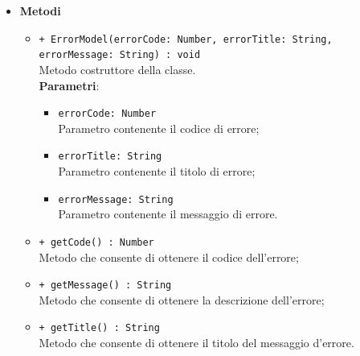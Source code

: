 \begin{itemize}
			\item \textbf{Metodi}
			\begin{itemize}
				\item \texttt{+ ErrorModel(errorCode: Number, errorTitle: String, errorMessage: String) : void} \\
				Metodo costruttore della classe.\\
				\textbf{Parametri}: 
				\begin{itemize}
					\item \texttt{errorCode: Number} \\
					Parametro contenente il codice di errore;
					\item \texttt{errorTitle: String} \\
					Parametro contenente il titolo di errore;
					\item \texttt{errorMessage: String} \\
					Parametro contenente il messaggio di errore.
				\end{itemize}
				\item \texttt{+ getCode() : Number} \\
				Metodo che consente di ottenere il codice dell'errore;
				\item \texttt{+ getMessage() : String} \\
				Metodo che consente di ottenere la descrizione dell'errore;
				\item \texttt{+ getTitle() : String} \\
				Metodo che consente di ottenere il titolo del messaggio d'errore. 
			\end{itemize}
		\end{itemize}
			
		